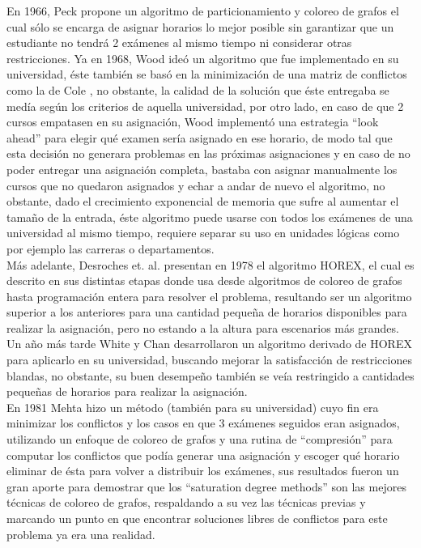 \documentclass[letter, 10pt]{article}
\begin{document}
En 1966, Peck \cite{10.1145/365696.365713} propone un algoritmo de particionamiento y coloreo de grafos el cual sólo se encarga de asignar horarios lo mejor posible sin garantizar que un estudiante no tendrá 2 exámenes al mismo tiempo ni considerar otras restricciones. Ya en 1968, Wood \cite{10.1093/comjnl/11.1.41} ideó un algoritmo que fue implementado en su universidad, éste también se basó en la minimización de una matriz de conflictos como la de Cole \cite{10.1093/comjnl/7.2.117}, no obstante, la calidad de la solución que éste entregaba se medía según los criterios de aquella universidad, por otro lado, en caso de que 2 cursos empatasen en su asignación, Wood implementó una estrategia ``look ahead'' para elegir qué examen sería asignado en ese horario, de modo tal que esta decisión no generara problemas en las próximas asignaciones y en caso de no poder entregar una asignación completa, bastaba con asignar manualmente los cursos que no quedaron asignados y echar a andar de nuevo el algoritmo, no obstante, dado el crecimiento exponencial de memoria que sufre al aumentar el tamaño de la entrada, éste algoritmo puede usarse con todos los exámenes de una universidad al mismo tiempo, requiere separar su uso en unidades lógicas como por ejemplo las carreras o departamentos.\\ 

Más adelante, Desroches et. al. \cite{11731709} presentan en 1978 el algoritmo HOREX, el cual es descrito en sus distintas etapas donde usa desde algoritmos de coloreo de grafos hasta programación entera para resolver el problema, resultando ser un algoritmo superior a los anteriores para una cantidad pequeña de horarios disponibles para realizar la asignación, pero no estando a la altura para escenarios más grandes. Un año más tarde White y Chan \cite{155986.1979.11731735} desarrollaron un algoritmo derivado de HOREX para aplicarlo en su universidad, buscando mejorar la satisfacción de restricciones blandas, no obstante, su buen desempeño también se veía restringido a cantidades pequeñas de horarios para realizar la asignación.\\ 

En 1981 Mehta \cite{10.2307/25060145} hizo un método (también para su universidad) cuyo fin era minimizar los conflictos y los casos en que 3 exámenes seguidos eran asignados, utilizando un enfoque de coloreo de grafos y una rutina de ``compresión'' para computar los conflictos que podía generar una asignación y escoger qué horario eliminar de ésta para volver a distribuir los exámenes, sus resultados fueron un gran aporte para demostrar que los ``saturation degree methods'' son las mejores técnicas de coloreo de grafos, respaldando a su vez las técnicas previas y marcando un punto en que encontrar soluciones libres de conflictos para este problema ya era una realidad.\\
\end{document}
